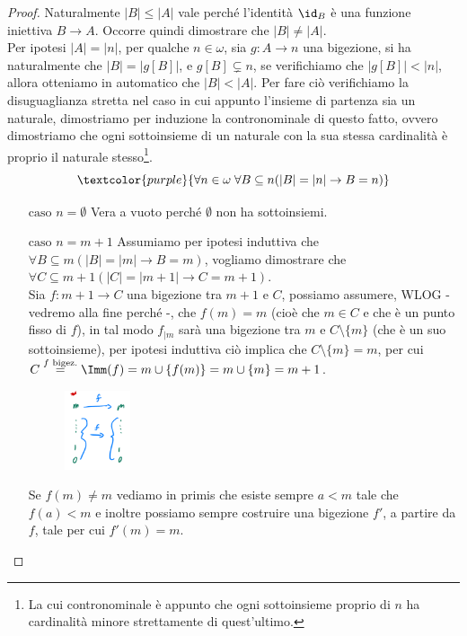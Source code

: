 \begin{proof}
	Naturalmente $|B| \leq |A|$ vale perché l'identità $\id_B$ è una funzione iniettiva $B \rightarrow A$. Occorre quindi dimostrare che $|B| \ne |A|$.\\
	Per ipotesi $|A| = |n|$, per qualche $n \in \omega$, sia $g : A \to n$ una bigezione, si ha naturalmente che $|B| = |g[B]|$, e $g[B] \subsetneq n$, se verifichiamo che $|g[B]| < |n|$,
	allora otteniamo in automatico che $|B| < |A|$. Per fare ciò verifichiamo la disuguaglianza stretta nel caso in cui appunto l'insieme di partenza sia un naturale, dimostriamo per induzione la contronominale di questo fatto,
	ovvero dimostriamo che ogni sottoinsieme di un naturale con la sua stessa cardinalità è proprio il naturale stesso\footnote{La cui contronominale è appunto che ogni sottoinsieme proprio di $n$ ha cardinalità minore strettamente di quest'ultimo.}.
	\[ \textcolor{purple}{\forall n \in \omega \; \forall B \subseteq n (|B|=|n|\rightarrow B = n)}
		\]
	\begin{itemize}
		\item[$\boxed{\text{caso $n = \emptyset$}}$] Vera a vuoto perché $\emptyset$ non ha sottoinsiemi.
		\item[$\boxed{\text{caso $n = m + 1$}}$] Assumiamo per ipotesi induttiva che $\forall B \subseteq m (|B| = |m| \rightarrow B = m)$, vogliamo dimostrare che $\forall C \subseteq m + 1 (|C| = |m + 1| \rightarrow C = m + 1)$.\\
		Sia $f : m + 1 \rightarrow C$ una bigezione tra $m + 1$ e $C$, possiamo assumere, WLOG - vedremo alla fine perché -, che $f(m) = m$ (cioè che $m \in C$ e che è un punto fisso di $f$), in tal modo $f_{|m}$ sarà una bigezione tra $m$ e $C \setminus\{m\}$ (che è un suo sottoinsieme), per ipotesi induttiva ciò implica che $C \setminus \{m\} = m$,
		per cui $C \overset{\text{$f$ bigez.}}{=}\Imm(f) = m \cup \{f(m)\} = m \cup \{m\} = m + 1$.
		\begin{figure}[H]
			\centering
			\includegraphics[width = 1.95cm]{immagini/cassetti1.png}
		\end{figure}
		Se $f(m) \ne m$ vediamo in primis che esiste sempre $a < m$ tale che $f(a) < m$ e inoltre possiamo sempre costruire una bigezione $f'$, a partire da $f$, tale per cui $f'(m) = m$.

\end{itemize}
\end{proof}
